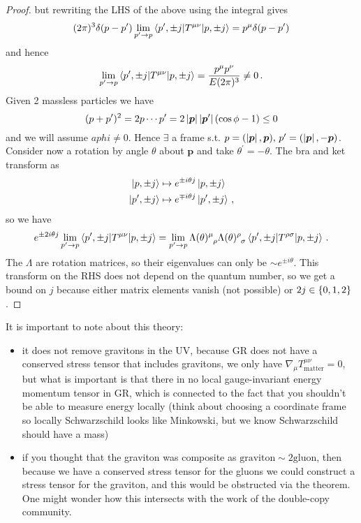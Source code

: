 \documentclass{article}
\begin{document}
\begin{itemize}
\begin{proof}
but rewriting the LHS of the above using the integral gives 
\[
(2\pi)^3 \delta(p-p^\prime)\lim_{p^\prime \to p} \left\langle p^\prime, \pm j  | T^{\mu\nu} | p, \pm j \right\rangle =  p^\mu \delta(p-p^\prime)
\]
and hence
\[
\lim_{p^\prime \to p} \left\langle p^\prime, \pm j  | T^{\mu\nu} | p, \pm j \right\rangle = \frac{p^\mu p^\nu}{E (2\pi)^3} \neq 0 \, .
\]
Given 2 massless particles we have 
\[
(p+p^\prime)^2 = 2p\cdots p^\prime = 2 \left\lvert \bm{p} \right\rvert\left\lvert \bm{p}^\prime \right\rvert (\cos\phi-1) \leq 0
\]
and we will assume $aphi \neq 0$. Hence $\exists$ a frame s.t. $p = (\left\lvert \bm{p} \right\rvert, \bm{p}), \, p^\prime = (\left\lvert \bm{p} \right\rvert, -\bm{p})$. Consider now a rotation by angle $\theta$ about $\bm{p}$ and take $\theta^\prime = -\theta$. The bra and ket transform as 
\begin{align*}
	\ket{p, \pm j} &\mapsto e^{\pm i \theta j} \ket{p, \pm j} \\
	\ket{p^\prime, \pm j} &\mapsto e^{\mp i \theta j} \ket{p^\prime, \pm j} \, ,
\end{align*}
so we have 
\[
e^{\pm 2i\theta j} \lim_{p^\prime \to p} \pangle{p^\prime, \pm j  | T^{\mu\nu} | p, \pm j} = \lim_{p^\prime \to p} \Lambda(\theta)\indices{^\mu_\rho} \Lambda(\theta)\indices{^\rho_\sigma} \pangle{p^\prime, \pm j  | T^{\rho\sigma} | p, \pm j} \, .
\]
The $\Lambda$ are rotation matrices, so their eigenvalues can only be $\sim e^{\pm i \theta}$. This transform on the RHS does not depend on the quantum number, so we get a bound on $j$ because either matrix elements vanish (not possible) or $2j \in \left\{ 0, 1, 2 \right\}$. 
\end{proof}
It is important to note about this theory:
\begin{itemize}
	\item it does not remove gravitons in the UV, because GR does not have a conserved stress tensor that includes gravitons, we only have $\nabla_\mu T^{\mu\nu}_{\text{matter}}=0$, but what is important is that there in no local gauge-invariant energy momentum tensor in GR, which is connected to the fact that you shouldn't be able to measure energy locally (think about choosing a coordinate frame so locally Schwarzschild looks like Minkowski, but we know Schwarzschild should have a mass)
	\item if you thought that the graviton was composite as $\text{graviton} \sim 2\text{gluon}$, then because we have a conserved stress tensor for the gluons we could construct a stress tensor for the graviton, and this would be obstructed via the theorem. One might wonder how this intersects with the work of the double-copy community.
\end{itemize}
\end{itemize}
\end{document}
